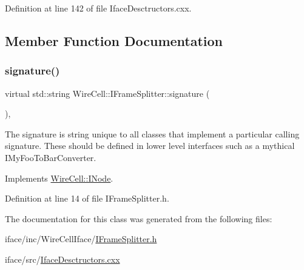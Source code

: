 Definition at line 142 of file Iface\+Desctructors.\+cxx.



\subsection{Member Function Documentation}
\mbox{\label{class_wire_cell_1_1_i_frame_splitter_aab4f057f5241c5c8f6b688450741daec}} 
\subsubsection{\texorpdfstring{signature()}{signature()}}
{\footnotesize\ttfamily virtual std\+::string Wire\+Cell\+::\+I\+Frame\+Splitter\+::signature (\begin{DoxyParamCaption}{ }\end{DoxyParamCaption})\hspace{0.3cm}{\ttfamily [inline]}, {\ttfamily [virtual]}}

The signature is string unique to all classes that implement a particular calling signature. These should be defined in lower level interfaces such as a mythical I\+My\+Foo\+To\+Bar\+Converter. 

Implements \hyperlink{class_wire_cell_1_1_i_node_a0b0763465adf5ba7febe8e378162b584}{Wire\+Cell\+::\+I\+Node}.



Definition at line 14 of file I\+Frame\+Splitter.\+h.



The documentation for this class was generated from the following files\+:\begin{DoxyCompactItemize}
\item 
iface/inc/\+Wire\+Cell\+Iface/\hyperlink{_i_frame_splitter_8h}{I\+Frame\+Splitter.\+h}\item 
iface/src/\hyperlink{_iface_desctructors_8cxx}{Iface\+Desctructors.\+cxx}\end{DoxyCompactItemize}

